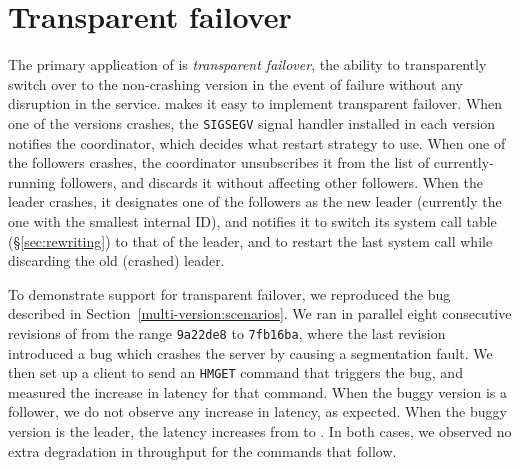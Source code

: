 \section{Transparent failover}
\label{sec:applications}


The primary application of \varan is \emph{transparent failover}, \ie the
ability to transparently switch over to the non-crashing version in the event
of failure without any disruption in the service.
\varan makes it easy to implement transparent failover.  When one of the
versions crashes, the \lstinline`SIGSEGV` signal handler installed in each
version notifies the coordinator, which decides what restart strategy to use.
When one of the followers crashes, the coordinator unsubscribes it from the
list of currently-running followers, and discards it without affecting other
followers.  When the leader crashes, it designates one of the followers as the
new leader (currently the one with the smallest internal ID), and notifies it
to switch its system call table (\S\ref{sec:rewriting}) to that of the leader,
and to restart the last system call while discarding the old (crashed) leader.


To demonstrate support for transparent failover, we reproduced the
\redis bug described in Section~\ref{multi-version:scenarios}.  We ran
in parallel eight consecutive revisions of \redis from the range
\lstinline`9a22de8` to \lstinline`7fb16ba`, where the last revision
introduced a bug which crashes the server by causing a segmentation
fault. We then set up a client to send an \lstinline`HMGET` command that
triggers the bug, and measured the increase in latency for that command.
When the buggy version is a follower, we do not observe any increase in
latency, as expected.  When the buggy version is the leader, the latency
increases from \redisnormallatency to \redisfailoverlatency.  In both
cases, we observed no extra degradation in throughput for the commands
that follow.

